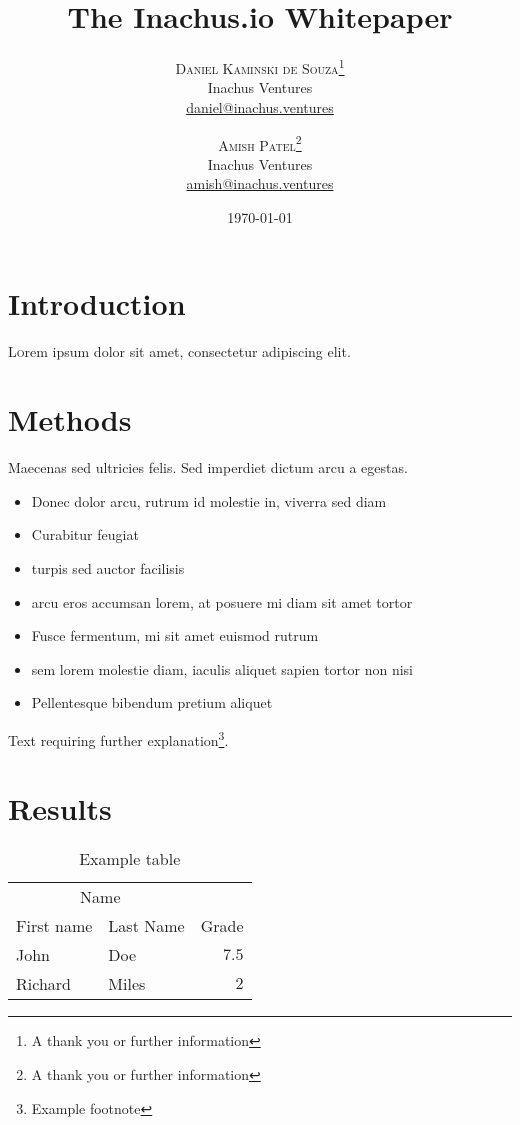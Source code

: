 \documentclass[twoside,twocolumn]{article}
\title{The Inachus.io Whitepaper} %
\author{
  \textsc{Daniel Kaminski de Souza}\thanks{A thank you or further information} \\[1ex] %
  \normalsize Inachus Ventures \\ %
  \normalsize \href{mailto:daniel@inachus.ventures}{daniel@inachus.ventures} %
  \and %
  \textsc{Amish Patel}\thanks{A thank you or further information} \\[1ex] %
  \normalsize Inachus Ventures \\ %
  \normalsize \href{mailto:amish@inachus.ventures}{amish@inachus.ventures} %
}
\date{\today} %
\begin{document}
\maketitle


\section{Introduction}

\lettrine[nindent=0em,lines=3]{L} orem ipsum dolor sit amet, consectetur adipiscing elit.
\blindtext %

\blindtext %


\section{Methods}

Maecenas sed ultricies felis. Sed imperdiet dictum arcu a egestas.
\begin{itemize}
  \item Donec dolor arcu, rutrum id molestie in, viverra sed diam
  \item Curabitur feugiat
  \item turpis sed auctor facilisis
  \item arcu eros accumsan lorem, at posuere mi diam sit amet tortor
  \item Fusce fermentum, mi sit amet euismod rutrum
  \item sem lorem molestie diam, iaculis aliquet sapien tortor non nisi
  \item Pellentesque bibendum pretium aliquet
\end{itemize}
\blindtext %

Text requiring further explanation\footnote{Example footnote}.


\section{Results}

\begin{table}
  \caption{Example table}
  \centering
  \begin{tabular}{llr}
    \toprule
    \multicolumn{2}{c}{Name}       \\
    \cmidrule(r){1-2}
    First name & Last Name & Grade \\
    \midrule
    John       & Doe       & $7.5$ \\
    Richard    & Miles     & $2$   \\
    \bottomrule
  \end{tabular}
\end{table}
\end{document}
